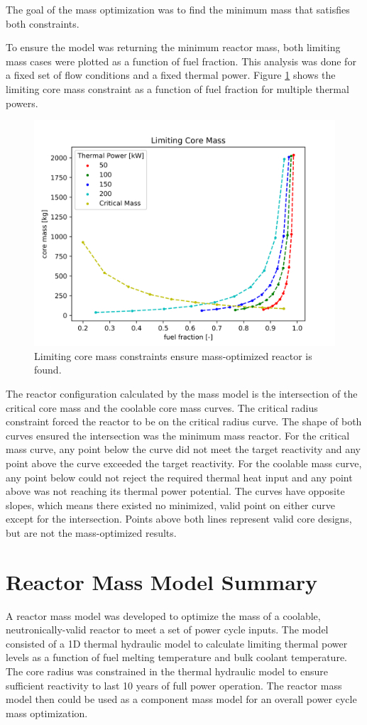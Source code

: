 The goal of the mass optimization was to find the minimum mass that satisfies
both constraints.

To ensure the model was returning the minimum reactor mass, both limiting mass
cases were plotted as a function of fuel fraction. This analysis was done for a
fixed set of flow conditions and a fixed thermal power. Figure
\ref{fig:limiting_core_mass} shows the limiting core mass constraint as a
function of fuel fraction for multiple thermal powers.

\begin{figure}[h]
    \centering
    \includegraphics[width=5in]{../images/limiting_core_mass.png}
\caption{Limiting core mass constraints ensure mass-optimized reactor is found.}
\label{fig:limiting_core_mass}
\end{figure}

The reactor configuration calculated by the mass model is the intersection of
the critical core mass and the coolable core mass curves. The critical radius
constraint forced the reactor to be on the critical radius curve. The shape of
both curves ensured the intersection was the minimum mass reactor. For the
critical mass curve, any point below the curve did not meet the target
reactivity and any point above the curve exceeded the target reactivity. For the
coolable mass curve, any point below could not reject the required thermal heat
input and any point above was not reaching its thermal power potential. The
curves have opposite slopes, which means there existed no minimized, valid point on either
curve except for the intersection. Points above both lines represent valid
core designs, but are not the mass-optimized results.

\section{Reactor Mass Model Summary}
A reactor mass model was developed to optimize the mass of a coolable,
neutronically-valid reactor to meet a set of power cycle inputs. The model
consisted of a 1D thermal hydraulic model to calculate limiting thermal power
levels as a function of fuel melting temperature and bulk coolant temperature.
The core radius was constrained in the thermal hydraulic model to ensure
sufficient reactivity to last 10 years of full power operation. The reactor mass
model then could be used as a component mass model for an overall power cycle
mass optimization.
